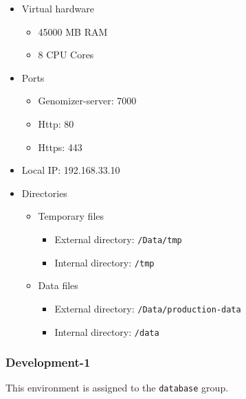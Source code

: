 \begin{itemize}
\itemsep1pt\parskip0pt
\item
  Virtual hardware

  \begin{itemize}
  \itemsep1pt\parskip0pt
  \item
    45000 MB RAM
  \item
    8 CPU Cores
  \end{itemize}
\item
  Ports

  \begin{itemize}
  \itemsep1pt\parskip0pt
  \item
    Genomizer-server: 7000
  \item
    Http: 80
  \item
    Https: 443
  \end{itemize}
\item
  Local IP: 192.168.33.10
\item
  Directories

  \begin{itemize}
  \itemsep1pt\parskip0pt
  \item
    Temporary files

    \begin{itemize}
    \itemsep1pt\parskip0pt
    \item
      External directory: \texttt{/Data/tmp}
    \item
      Internal directory: \texttt{/tmp}
    \end{itemize}
  \item
    Data files

    \begin{itemize}
    \itemsep1pt\parskip0pt
    \item
      External directory: \texttt{/Data/production-data}
    \item
      Internal directory: \texttt{/data}
    \end{itemize}
  \end{itemize}
\end{itemize}

\subsubsection{Development-1}\label{sec:development-1}

This environment is assigned to the \texttt{database} group.


